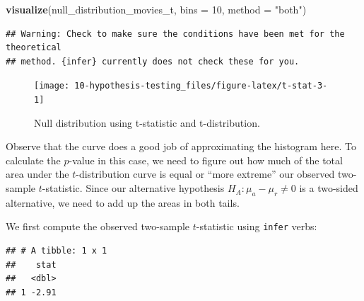 \documentclass[
]{book}
\newenvironment{Shaded}{\begin{snugshade}}{\end{snugshade}}
\newcommand{\DataTypeTok}[1]{\textcolor[rgb]{0.13,0.29,0.53}{#1}}
\newcommand{\DecValTok}[1]{\textcolor[rgb]{0.00,0.00,0.81}{#1}}
\newcommand{\KeywordTok}[1]{\textcolor[rgb]{0.13,0.29,0.53}{\textbf{#1}}}
\newcommand{\NormalTok}[1]{#1}
\newcommand{\OperatorTok}[1]{\textcolor[rgb]{0.81,0.36,0.00}{\textbf{#1}}}
\newcommand{\StringTok}[1]{\textcolor[rgb]{0.31,0.60,0.02}{#1}}
\begin{document}
\begin{Shaded}
\begin{Highlighting}[]
\KeywordTok{visualize}\NormalTok{(null_distribution_movies_t, }\DataTypeTok{bins =} \DecValTok{10}\NormalTok{, }\DataTypeTok{method =} \StringTok{"both"}\NormalTok{)}
\end{Highlighting}
\end{Shaded}

\begin{verbatim}
## Warning: Check to make sure the conditions have been met for the theoretical
## method. {infer} currently does not check these for you.
\end{verbatim}

\begin{figure}

{\centering \texttt{[image: 10-hypothesis-testing\_files/figure-latex/t-stat-3-1]} 

}

\caption{Null distribution using t-statistic and t-distribution.}\label{fig:t-stat-3}
\end{figure}

Observe that the curve does a good job of approximating the histogram here. To calculate the \(p\)-value in this case, we need to figure out how much of the total area under the \(t\)-distribution curve is equal or ``more extreme'' our observed two-sample \(t\)-statistic. Since our alternative hypothesis \(H_A: \mu_a - \mu_r \neq 0\) is a two-sided alternative, we need to add up the areas in both tails.

We first compute the observed two-sample \(t\)-statistic using \texttt{infer} verbs:

\begin{Shaded}
\end{Shaded}

\begin{verbatim}
## # A tibble: 1 x 1
##    stat
##   <dbl>
## 1 -2.91
\end{verbatim}
\end{document}
